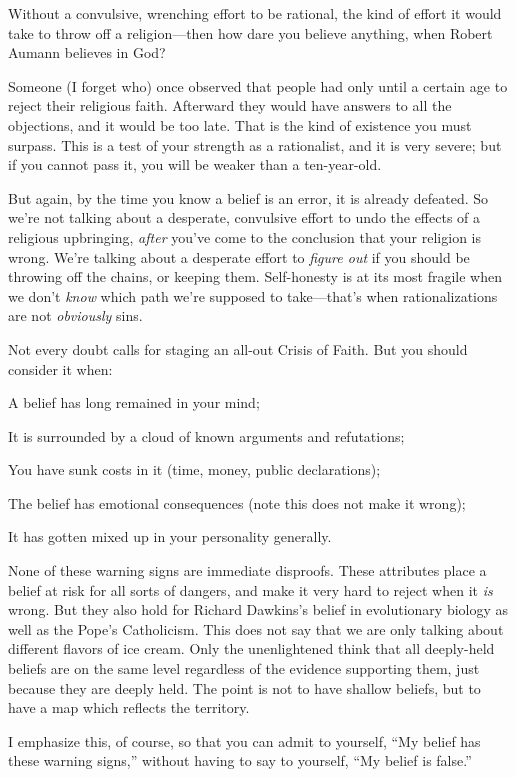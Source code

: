 {
 Without a convulsive, wrenching effort to be rational, the kind of
effort it would take to throw off a religion---then how dare you
believe anything, when Robert Aumann believes in God?}

{
 Someone (I forget who) once observed that people had only until a
certain age to reject their religious faith. Afterward they would have
answers to all the objections, and it would be too late. That is the
kind of existence you must surpass. This is a test of your strength as
a rationalist, and it is very severe; but if you cannot pass it, you
will be weaker than a ten-year-old.}

{
 But again, by the time you know a belief is an error, it is
already defeated. So we're not talking about a
desperate, convulsive effort to undo the effects of a religious
upbringing, \textit{after} you've come to the
conclusion that your religion is wrong. We're talking
about a desperate effort to \textit{figure out} if you should be
throwing off the chains, or keeping them. Self-honesty is at its most
fragile when we don't \textit{know} which path
we're supposed to take---that's when
rationalizations are not \textit{obviously} sins.}

{
 Not every doubt calls for staging an all-out Crisis of Faith. But
you should consider it when:}

{
 A belief has long remained in your mind;}

{
 It is surrounded by a cloud of known arguments and refutations;}

{
 You have sunk costs in it (time, money, public declarations);}

{
 The belief has emotional consequences (note this does not make it
wrong);}

{
 It has gotten mixed up in your personality generally.}

{
 None of these warning signs are immediate disproofs. These
attributes place a belief at risk for all sorts of dangers, and make it
very hard to reject when it \textit{is} wrong. But they also hold for
Richard Dawkins's belief in evolutionary biology as
well as the Pope's Catholicism. This does not say that
we are only talking about different flavors of ice cream. Only the
unenlightened think that all deeply-held beliefs are on the same level
regardless of the evidence supporting them, just because they are
deeply held. The point is not to have shallow beliefs, but to have a
map which reflects the territory.}

{
 I emphasize this, of course, so that you can admit to yourself,
``My belief has these warning
signs,'' without having to say to yourself,
``My belief is false.''}


